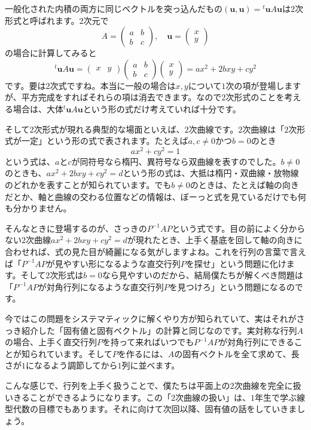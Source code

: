 一般化された内積の両方に同じベクトルを突っ込んだもの$(\bm{u}, \bm{u}) = {}^t\bm{u} A \bm{u}$は$2$次形式と呼ばれます。$2$次元で
\[
A = 
\begin{pmatrix}
a & b \\
b & c
\end{pmatrix}, \quad
\bm{u} = 
\begin{pmatrix}
x \\
y
\end{pmatrix}
\]
の場合に計算してみると
\[
{}^t\bm{u} A \bm{u} =
\begin{pmatrix}
x & y
\end{pmatrix}
\begin{pmatrix}
a & b \\
b & c
\end{pmatrix}
\begin{pmatrix}
x \\
y
\end{pmatrix}
= a x^2 + 2bxy + c y^2
\]
です。要は$2$次式ですね。本当に一般の場合は$x, y$について$1$次の項が登場しますが、平方完成をすればそれらの項は消去できます。なので$2$次形式のことを考える場合は、大体${}^t\bm{u} A \bm{u}$という形の式だけ考えていれば十分です。

そして$2$次形式が現れる典型的な場面といえば、$2$次曲線です。$2$次曲線は「$2$次形式が一定」という形の式で表されます。たとえば$a, c \neq 0$かつ$b = 0$のとき
\[
a x^2 + c y^2 = 1
\]
という式は、$a$と$c$が同符号なら楕円、異符号なら双曲線を表すのでした。$b \neq 0$のときも、$a x^2 + 2b xy + c y^2 = d$という形の式は、大抵は楕円・双曲線・放物線のどれかを表すことが知られています。でも$b \neq 0$のときは、たとえば軸の向きだとか、軸と曲線の交わる位置などの情報は、ぼーっと式を見ているだけでも何も分かりません。

そんなときに登場するのが、さっきの$P^{-1} A P$という式です。目の前によく分からない$2$次曲線$a x^2 + 2b xy + cy^2 = d$が現れたとき、上手く基底を回して軸の向きに合わせれば、式の見た目が綺麗になる気がしますよね。これを行列の言葉で言えば「$P^{-1} A P$が見やすい形になるような直交行列$P$を探せ」という問題に化けます。そして$2$次形式は$b = 0$なら見やすいのだから、結局僕たちが解くべき問題は「$P^{-1} A P$が対角行列になるような直交行列$P$を見つけろ」という問題になるのです。

今ではこの問題をシステマティックに解くやり方が知られていて、実はそれがさっき紹介した「固有値と固有ベクトル」の計算と同じなのです。実対称な行列$A$の場合、上手く直交行列$P$を持って来ればいつでも$P^{-1} A P$が対角行列にできることが知られています。そして$P$を作るには、$A$の固有ベクトルを全て求めて、長さが$1$になるよう調節してから$1$列に並べます。

こんな感じで、行列を上手く扱うことで、僕たちは平面上の$2$次曲線を完全に扱いきることができるようになります。この「$2$次曲線の扱い」は、$1$年生で学ぶ線型代数の目標でもあります。それに向けて次回以降、固有値の話をしていきましょう。
